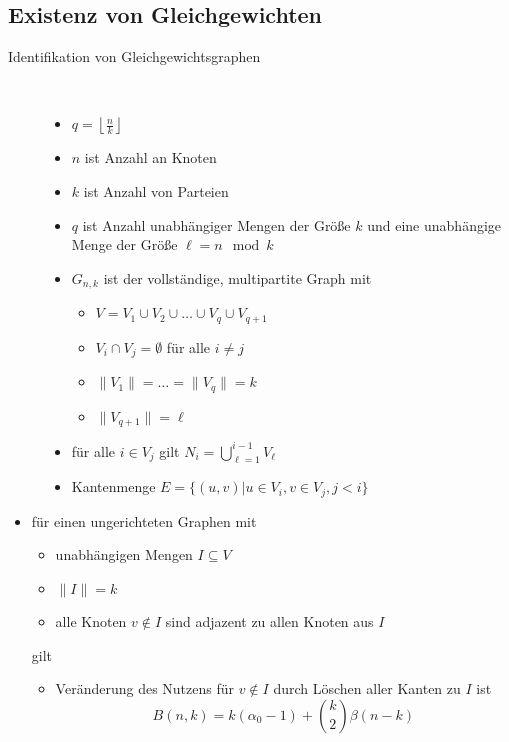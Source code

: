 \subsection{Existenz von Gleichgewichten}
	\begin{description}
		\item[Identifikation von Gleichgewichtsgraphen] \ \\\vspace*{-\baselineskip}
			\begin{itemize}
				\item $q=\left\lfloor\frac{n}{k}\right\rfloor$
				\item $n$ ist Anzahl an Knoten
				\item $k$ ist Anzahl von Parteien
				\item $q$ ist Anzahl unabhängiger Mengen der Größe $k$ und eine unabhängige Menge der Größe \mbox{$\ell = n \mod k$}
				\item $G_{n,k}$ ist der vollständige, multipartite Graph mit
					\begin{itemize}
						\item $V= V_1 \cup V_2 \cup \dots \cup V_q \cup V_{q+1}$
						\item $V_i \cap V_j = \emptyset$ für alle $i\neq j$
						\item $\| V_1\|= \dots =\|V_q\|=k$
						\item $\|V_{q+1}\|=\ell$
					\end{itemize}
				\item für alle $i\in V_j$ gilt $N_i=\bigcup\limits_{\ell=1}^{i-1}V_\ell$
				\item Kantenmenge $E=\{(u,v)|u\in V_i, v\in V_j, j<i\}$
			\end{itemize}
	\end{description}
	\begin{itemize}
		\item für einen ungerichteten Graphen mit
			\begin{itemize}
				\item unabhängigen Mengen $I\subseteq V$
				\item $\|I\|=k$
				\item alle Knoten $v\notin I$ sind adjazent zu allen Knoten aus $I$
			\end{itemize}
			gilt
			\begin{itemize}
				\item Veränderung des Nutzens für $v\notin I$ durch Löschen aller Kanten zu $I$ ist
					\[B(n,k)=k(\alpha_0-1)+{k \choose 2}\beta(n-k)\]
			\end{itemize}
	\end{itemize}

